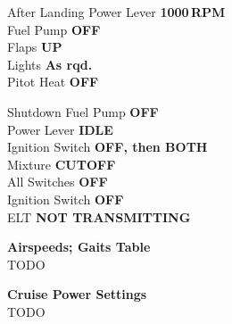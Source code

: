 \documentclass{article}
\newcommand{\checkitem}[2]{#1 \dotfill \textbf{#2} \\}
\begin{document}
\begin{multicols}{3}
    \begin{checklistbox}[blue]{After Landing}
        \checkitem{Power Lever}{1000\,RPM}
        \checkitem{Fuel Pump}{OFF}
        \checkitem{Flaps}{UP}
        \checkitem{Lights}{As rqd.}
        \checkitem{Pitot Heat}{OFF}
    \end{checklistbox}

    \begin{checklistbox}[purple]{Shutdown}
        \checkitem{Fuel Pump}{OFF}
        \checkitem{Power Lever}{IDLE}
        \checkitem{Ignition Switch}{OFF, then BOTH}
        \checkitem{Mixture}{CUTOFF}
        \checkitem{All Switches}{OFF}
        \checkitem{Ignition Switch}{OFF}
        \checkitem{ELT}{NOT TRANSMITTING}
    \end{checklistbox}

\end{multicols}


\begin{checklistbox}{}
    \textbf{Airspeeds; Gaits Table} \\
    \checkitem{TODO}{}
\end{checklistbox}


\begin{checklistbox}{}
    \textbf{\normalsize Cruise Power Settings} \\
    \checkitem{TODO}{}
\end{checklistbox}
\end{document}
